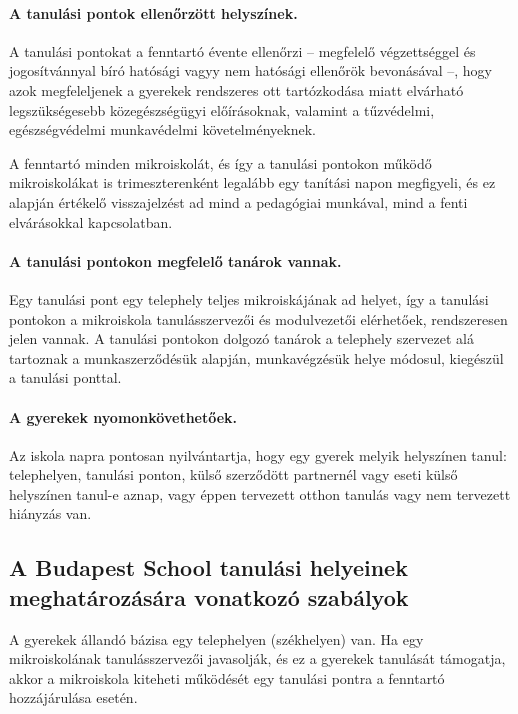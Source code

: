 \paragraph{A tanulási pontok ellenőrzött helyszínek.}

A tanulási pontokat a fenntartó évente ellenőrzi -- megfelelő végzettséggel és jogosítvánnyal bíró hatósági vagyy nem hatósági ellenőrök bevonásával --, hogy azok megfeleljenek a gyerekek rendszeres ott tartózkodása miatt elvárható legszükségesebb közegészségügyi előírásoknak, valamint a tűzvédelmi, egészségvédelmi  munkavédelmi követelményeknek.

A fenntartó minden mikroiskolát, és így a tanulási pontokon működő mikroiskolákat is trimeszterenként legalább egy tanítási napon megfigyeli, és ez alapján értékelő visszajelzést ad mind a pedagógiai munkával, mind a fenti elvárásokkal kapcsolatban.

\paragraph{A tanulási pontokon megfelelő tanárok vannak.}

Egy tanulási pont egy telephely teljes mikroiskájának ad helyet, így a tanulási pontokon a mikroiskola tanulásszervezői és modulvezetői elérhetőek, rendszeresen jelen vannak. A tanulási pontokon dolgozó tanárok a telephely szervezet alá tartoznak a munkaszerződésük alapján, munkavégzésük helye módosul, kiegészül a tanulási ponttal.

\paragraph{A gyerekek nyomonkövethetőek.}

Az iskola napra pontosan nyilvántartja,
hogy egy gyerek melyik helyszínen tanul: telephelyen, tanulási ponton,
külső szerződött partnernél vagy eseti külső helyszínen tanul-e
aznap,
vagy éppen tervezett otthon tanulás vagy nem tervezett hiányzás van.

\subsection{A Budapest School tanulási helyeinek meghatározására vonatkozó szabályok}
A gyerekek állandó bázisa egy telephelyen (székhelyen) van. Ha egy mikroiskolának tanulásszervezői javasolják, és ez a gyerekek tanulását támogatja, akkor a mikroiskola kiteheti működését egy tanulási pontra a fenntartó hozzájárulása esetén.

